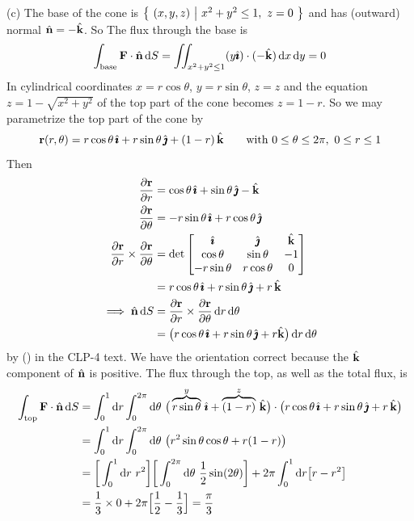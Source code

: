 \begin{solution}
(c)
The base of the cone is $\big\{ \ (x,y,z)\ \big|\ x^2+y^2\le1,\ z=0\ \big\}$
and has (outward) normal $\hat{\mathbf{n}}=-\hat{\mathbf{k}}$. So
The flux through the base is
\begin{equation*}
\int_{{\rm base}}\mathbf{F}\cdot\hat{\mathbf{n}}\, \mathrm{d}S
=\iint_{x^2+y^2\le 1}(y\hat{\pmb{\imath}})\cdot(-\hat{\mathbf{k}})\,\mathrm{d}x\,\mathrm{d}y=0
\end{equation*}
In cylindrical coordinates
$x=r\cos\theta$,
$y=r\sin\theta$,
$z=z$
and the equation $z=1-\sqrt{x^2+y^2}$ of the top part of the cone
becomes $z=1-r$. So we may parametrize the top part of the cone by 
\begin{equation*}
\mathbf{r}(r,\theta)=r\cos\theta\,\hat{\pmb{\imath}}+r\sin\theta\,\hat{\pmb{\jmath}}
+(1-r)\,\hat{\mathbf{k}}
\qquad\text{with } 0\le\theta\le 2\pi,\ 0\le r\le 1
\end{equation*}
Then
\begin{align*}
\pdiff{\vr}{r}&=\cos\theta\,\hi+\sin\theta\,\hj-\hk\\
\pdiff{\vr}{\theta}&=-r\sin\theta\,\hi+r\cos\theta\,\hj\\
\pdiff{\vr}{r}\times\pdiff{\vr}{\theta}
&=\det\left[\begin{matrix}
                    \hi   & \hj   & \hk \\
               \cos\theta & \sin\theta & -1 \\
               -r\sin\theta & r\cos\theta & 0 \end{matrix}\right] \\
&=  r\cos\theta\,\hi+r\sin\theta\,\hj+r\,\hk \\
\implies \hn\,\dee{S}&=\pdiff{\vr}{r}\times\pdiff{\vr}{\theta}
                      \, \dee{r}\,\dee{\theta} \\
&=\big( r\cos\theta\,\hi+ r\sin\theta\,\hj+r\hk\big)\, \dee{r}\,\dee{\theta}
\end{align*}
by () in the CLP-4 text.
We have the orientation correct because the $\hat{\mathbf{k}}$ component of $\hat{\mathbf{n}}$ is
positive. The flux through the top, as well as the total flux, is
\begin{align*}
\int_{{\rm top}}\vF\cdot\hn\, \dee{S}
&=\int_0^1 \dee{r}\int_0^{2\pi}\dee{\theta}\ 
                   \big(\overbrace{r\sin\theta}^{y}\,\hi
                   +\overbrace{(1-r)}^{z}\,\hk\big)
\cdot\big(r\cos\theta\,\hi+r\sin\theta\,\hj+r\,\hk\big)\\
&=\int_0^1 \dee{r}\int_0^{2\pi}\dee{\theta}\ \big(r^2\sin\theta\cos\theta+r(1-r)\big)
\\
&= \bigg[\int_0^1 \dee{r}\ r^2\bigg]
         \bigg[\int_0^{2\pi}\dee{\theta}\ \frac{1}{2}\sin(2\theta)\bigg]
   +2\pi \int_0^1 \dee{r}\big[r-r^2\big] \\
&=\frac{1}{3}\times 0+2\pi\Big[\frac{1}{2}-\frac{1}{3}\Big]
=\frac{\pi}{3}
\end{align*}
\end{solution}







